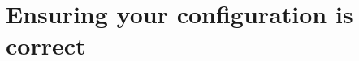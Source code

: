\documentclass[handout]{beamer}\mode<presentation>{\usetheme{AMSCesenaPurpleAndGold}}
\begin{document}


    

    

\section{Ensuring your configuration is correct}
\end{document}
